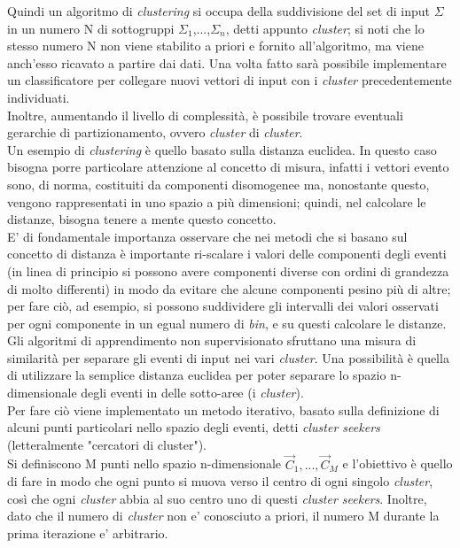 Quindi un algoritmo di \textit{clustering} si occupa della suddivisione del set di input $\Sigma$ in un numero N di sottogruppi $\Sigma_1$,...,$\Sigma_n$, detti appunto \textit{cluster}; si noti che lo stesso numero N non viene stabilito a priori e fornito all'algoritmo, ma viene anch'esso ricavato a partire dai dati. Una volta fatto sarà possibile implementare un classificatore per collegare nuovi vettori di input con i \textit{cluster} precedentemente individuati.\\
Inoltre, aumentando il livello di complessità, è possibile trovare eventuali gerarchie di partizionamento, ovvero \textit{cluster} di \textit{cluster}.\\
Un esempio di \textit{clustering} è quello basato sulla distanza euclidea. In questo caso bisogna porre particolare attenzione al concetto di misura, infatti i vettori evento sono, di norma, costituiti da componenti disomogenee ma, nonostante questo, vengono rappresentati in uno spazio a più dimensioni; quindi, nel calcolare le distanze, bisogna tenere a mente questo concetto.\\
E' di fondamentale importanza osservare che nei metodi che si basano sul concetto di distanza è importante ri-scalare i valori delle componenti degli eventi (in linea di principio si possono avere componenti diverse con ordini di grandezza di molto differenti) in modo da evitare che alcune componenti pesino più di altre; per fare ciò, ad esempio, si possono suddividere gli intervalli dei valori osservati per ogni componente in un egual numero di \textit{bin}, e su questi calcolare le distanze. \\
Gli algoritmi di apprendimento non supervisionato sfruttano una misura di similarità per separare gli eventi di input nei vari \textit{cluster}. Una possibilità è quella di utilizzare la semplice distanza euclidea per poter separare lo spazio n-dimensionale degli eventi in delle sotto-aree (i \textit{cluster}). \\
Per fare ciò viene implementato un metodo iterativo, basato sulla definizione di alcuni punti particolari nello spazio degli eventi, detti \textit{cluster seekers} (letteralmente "cercatori di cluster"). \\
Si definiscono M punti nello spazio n-dimensionale $\vec{C}_{1},...,\vec{C}_{M}$ e l'obiettivo è quello di fare in modo che ogni punto si muova verso il centro di ogni singolo \textit{cluster}, così che ogni \textit{cluster} abbia al suo centro uno di questi \textit{cluster seekers}. Inoltre, dato che il numero di \textit{cluster} non e' conosciuto a priori, il numero M durante la prima iterazione e' arbitrario. \\
